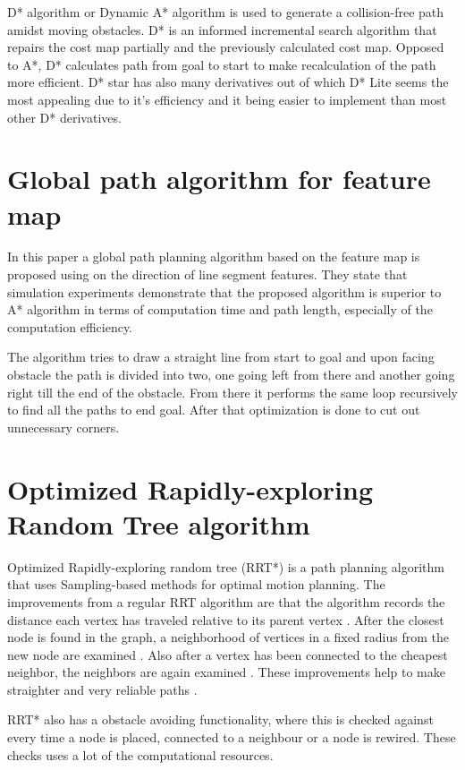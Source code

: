 \documentclass[12pt, a4paper, onecolumn]{article}
\begin{document}
D* algorithm or Dynamic A* algorithm is used to generate a collision-free path amidst moving obstacles.
D* is an informed incremental search algorithm that repairs the cost map partially and the previously calculated cost map. \cite{Karur21}
Opposed to A*, D* calculates path from goal to start to make recalculation of the path more efficient. \cite{DstarWiki}
D* star has also many derivatives out of which D* Lite seems the most appealing due to it's efficiency and it being easier to implement than most other D* derivatives.

\section{Global path algorithm for feature map}

In this \cite{Ren22} paper a global path planning algorithm based on the feature map is proposed using on the direction of line segment features. They state that simulation experiments demonstrate
that the proposed algorithm is superior to A* algorithm in terms of computation time
and path length, especially of the computation efficiency. \cite{Ren22}

The algorithm tries to draw a straight line from start to goal and upon facing obstacle the path is divided into two, one going left from there and another going right till the end of the obstacle.
From there it performs the same loop recursively to find all the paths to end goal.
After that optimization is done to cut out unnecessary corners. \cite{Ren22} %

\section{Optimized Rapidly-exploring Random Tree algorithm}

Optimized Rapidly-exploring random tree (RRT*) \cite{Karaman11} is a path planning algorithm that uses Sampling-based methods for optimal motion planning. The improvements from a regular RRT algorithm are that the algorithm records the distance each vertex has traveled relative to its parent vertex \cite{RRT19}. After the closest node is found in the graph, a neighborhood of vertices in a fixed radius from the new node are examined \cite{RRT19}. Also after a vertex has been connected to the cheapest neighbor, the neighbors are again examined \cite{RRT19}. These improvements help to make straighter and very reliable paths .

RRT* also has a obstacle avoiding functionality, where this is checked against every time a node is placed, connected to a neighbour or a node is rewired. These checks uses a lot of the computational resources. \cite{RRT19}
\end{document}

